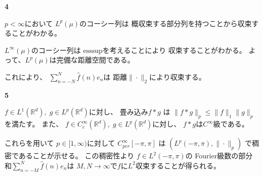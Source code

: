 \documentclass[12pt,b5paper]{ltjsarticle}
\begin{document}
\hrulefill

\newpage

\hrulefill
\textbf{4}
\hrulefill

$p<\infty$において
$L^{p}(\mu)$のコーシー列は
概収束する部分列を持つことから収束することがわかる。

$L^{\infty}(\mu)$のコーシー列は
$\mathrm{ess sup}$を考えることにより
収束することがわかる。
よって、$L^{p}(\mu)$は完備な距離空間である。

これにより、
$\displaystyle \sum_{n=-N}^{N}\hat{f}(n)e_{n}$は
距離$\| \cdot \|_{2}$により収束する。


\hrulefill



\hrulefill
\textbf{5}
\hrulefill

%
%
%
%



$f \in L^{1}(\mathbb{R}^{d}), \; g\in L^{p}(\mathbb{R}^{d})$に対し、
畳み込み$f\ast g$ は $\|f\ast g\|_{p} \leq \|f\|_{1} \| g\|_{p}$を満たす。
また、
$f\in C_{c}^{\infty}(\mathbb{R}^{d}), \; g\in L^{p}(\mathbb{R}^{d})$に対し、
$f\ast g$は$C^{\infty}$級である。

これらを用いて
$p\in [1,\infty)$に対して
$C_{per}^{\infty}[-\pi,\pi]$
 は
$(L^{p}(-\pi,\pi),\|\cdot\|_{p})$
で稠密であることが示せる。
この稠密性より
$f\in L^{2}(-\pi,\pi)$の
Fourier級数の部分和$\sum_{n=-M}^{N}\widehat{f}(n)e_{n}$は
$M,N\to \infty$で$f$に$L^{2}$収束することが得られる。







\hrulefill
\end{document}
